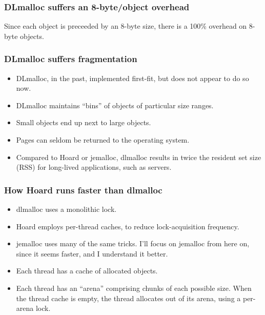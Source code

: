 \documentclass[xcolor=dvipsnames,14pt]{beamer}
\begin{document}
\begin{frame}
\frametitle{DLmalloc suffers an 8-byte/object overhead}

Since each object is preceeded by an 8-byte size, there is a 100\%
overhead on 8-byte objects.

\end{frame}

\begin{frame}
\frametitle{DLmalloc suffers fragmentation}

\begin{itemize}
\item DLmalloc, in the past, implemented first-fit, but does not appear to do so now.

\item DLmalloc maintains ``bins'' of objects of particular size ranges.

\item Small objects end up next to large objects.

\item Pages can seldom be returned to the operating system.

\item Compared to Hoard or jemalloc, dlmalloc results in twice the
  resident set size (RSS) for long-lived applications, such as
  servers.
\end{itemize}

\end{frame}

\begin{frame}
\frametitle{How Hoard runs faster than dlmalloc}

\begin{itemize}
\item dlmalloc uses a monolithic lock.
\item Hoard employs per-thread caches, to reduce lock-acquisition frequency.
\item jemalloc uses many of the same tricks.  I'll focus on jemalloc
  from here on, since it seems faster, and I understand it better.
\item Each thread has a cache of allocated objects.
\item Each thread has an ``arena'' comprising chunks of each possible size.  When the thread cache is empty, the thread allocates out of its arena, using a per-arena lock.
\end{itemize}

\end{frame}
\end{document}
